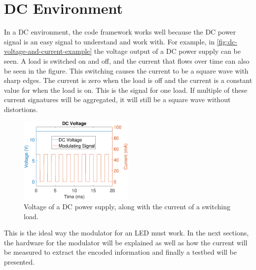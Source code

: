 
\section{DC Environment}
\label{sec:dc-environment}





In a DC environment, the code framework works well because the DC power signal is an easy signal to understand and work with.
For example, in \autoref{fig:dc-voltage-and-current-example} the voltage output of a DC power supply can be seen.
A load is switched on and off, and the current that flows over time can also be seen in the figure.
This switching causes the current to be a square wave with sharp edges.
The current is zero when the load is off and the current is a constant value for when the load is on.
This is the signal for one load.
If multiple of these current signatures will be aggregated, it will still be a square wave without distortions.

\begin{figure}[!h]
  \centering
  \includegraphics[angle=0,width=0.5\textwidth]{chapters/hardware-chapters/DC/dc-voltage-and-current-example.eps}
  \caption{Voltage of a DC power supply, along with the current of a switching load.}
  \label{fig:dc-voltage-and-current-example}
\end{figure}



This is the ideal way the modulator for an LED must work.
In the next sections, the hardware for the modulator will be explained as well as how the current will be measured to extract the encoded information and finally a testbed will be presented. 










